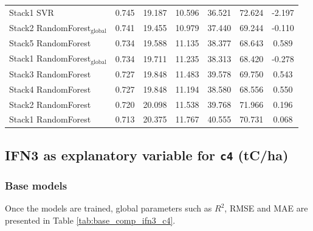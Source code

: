 \begin{table}[tp]
{\begin{tabular}{p{4.5cm}cccccc}
        Stack1 SVR & 0.745 & 19.187 & 10.596 & 36.521 & 72.624 & -2.197 \\
        Stack2 RandomForest$_{\text{global}}$ & 0.741 & 19.455 & 10.979 & 37.440 & 69.244 & -0.110 \\
        Stack5 RandomForest & 0.734 & 19.588 & 11.135 & 38.377 & 68.643 & 0.589 \\
        Stack1 RandomForest$_{\text{global}}$ & 0.734 & 19.711 & 11.235 & 38.313 & 68.420 & -0.278 \\
        Stack3 RandomForest & 0.727 & 19.848 & 11.483 & 39.578 & 69.750 & 0.543 \\
        Stack4 RandomForest & 0.727 & 19.848 & 11.194 & 38.580 & 68.556 & 0.550 \\
        Stack2 RandomForest & 0.720 & 20.098 & 11.538 & 39.768 & 71.966 & 0.196 \\
        Stack1 RandomForest & 0.713 & 20.375 & 11.767 & 40.555 & 70.731 & 0.068 \\
            \bottomrule
    \end{tabular}
    }
\end{table}


\clearpage
\subsection{IFN3 as explanatory variable for \texttt{c4} (tC/ha)}

\subsubsection{Base models}

Once the models are trained, global parameters such as $R^2$, RMSE and MAE are presented in Table \ref{tab:base_comp_ifn3_c4}.

